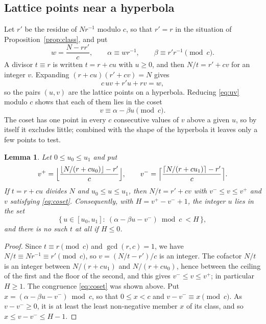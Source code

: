 \documentclass[11pt,reqno]{amsart}
\numberwithin{equation}{section}
\theoremstyle{plain}
\newtheorem{lemma}[theorem]{Lemma}
\theoremstyle{definition}
\theoremstyle{remark}
\begin{document}
\subsection{Lattice points near a hyperbola}\label{sec:lattice}
Let $r'$ be the residue of $Nr^{-1}$ modulo $c$, so that $r'=r$ in the
situation of Proposition~\ref{prop:class}, and put
\[
  w=\frac{N-rr'}{c},\qquad \alpha\equiv wr^{-1},\qquad
  \beta\equiv r'r^{-1}\pmod c .
\]
A divisor $t\equiv r$ is written $t=r+cu$ with $u\ge0$, and then
$N/t=r'+cv$ for an integer $v$. Expanding
$(r+cu)(r'+cv)=N$ gives
\begin{equation}\label{eq:uv}
  c\,uv+r'u+rv=w ,
\end{equation}
so the pairs $(u,v)$ are the lattice points on a hyperbola. Reducing
\eqref{eq:uv} modulo $c$ shows that each of them lies in the coset
\begin{equation}\label{eq:coset}
  v\equiv\alpha-\beta u\pmod c .
\end{equation}
The coset has one point in every $c$ consecutive values of $v$ above a
given $u$, so by itself it excludes little; combined with the shape of
the hyperbola it leaves only a few points to test.

\begin{lemma}\label{lem:box}
Let $0\le u_0\le u_1$ and put
\[
  v^+=\Bigl\lfloor\frac{\lfloor N/(r+cu_0)\rfloor-r'}{c}\Bigr\rfloor,\qquad
  v^-=\Bigl\lceil\frac{\lceil N/(r+cu_1)\rceil-r'}{c}\Bigr\rceil .
\]
If $t=r+cu$ divides $N$ and $u_0\le u\le u_1$, then $N/t=r'+cv$ with
$v^-\le v\le v^+$ and $v$ satisfying \eqref{eq:coset}. Consequently,
with $H=v^+-v^-+1$, the integer $u$ lies in the set
\begin{equation}\label{eq:window}
  \bigl\{\,u\in[u_0,u_1]:\ (\alpha-\beta u-v^-)\bmod c\ <H\,\bigr\},
\end{equation}
and there is no such $t$ at all if $H\le0$.
\end{lemma}

\begin{proof}
Since $t\equiv r\pmod c$ and $\gcd(r,c)=1$, we have
$N/t\equiv Nr^{-1}\equiv r'\pmod c$, so $v=(N/t-r')/c$ is an integer.
The cofactor $N/t$ is an integer between $N/(r+cu_1)$ and
$N/(r+cu_0)$, hence between the ceiling of the first and the floor of
the second, and this gives $v^-\le v\le v^+$; in particular $H\ge1$.
The congruence \eqref{eq:coset} was shown above. Put
$x=(\alpha-\beta u-v^-)\bmod c$, so that $0\le x<c$ and
$v-v^-\equiv x\pmod c$. As $v-v^-\ge0$, it is at least the least
non-negative member $x$ of its class, and so $x\le v-v^-\le H-1$.
\end{proof}
\end{document}
